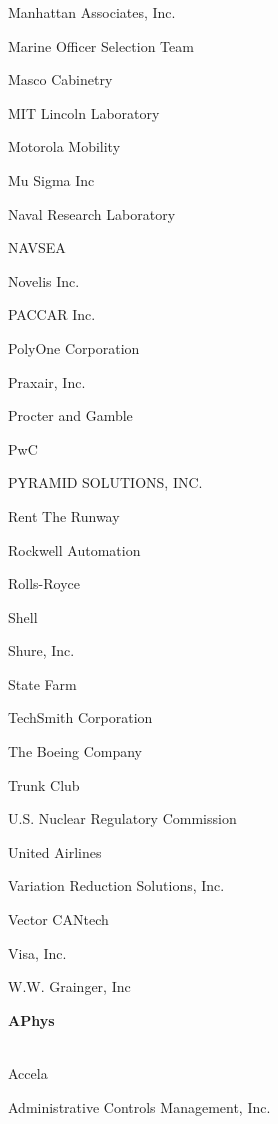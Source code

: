 \documentclass[twoside]{article}
\begin{document}
\begin{center}
\begin{multicols}{5}
\begin{FlushLeft}
\begin{compactitem}
\item Manhattan Associates, Inc.
\item Marine Officer Selection Team
\item Masco Cabinetry
\item MIT Lincoln Laboratory
\item Motorola Mobility
\item Mu Sigma Inc
\item Naval Research Laboratory
\item NAVSEA
\item Novelis Inc.
\item PACCAR Inc.
\item PolyOne Corporation
\item Praxair, Inc.
\item Procter and Gamble
\item PwC
\item PYRAMID SOLUTIONS, INC.
\item Rent The Runway
\item Rockwell Automation
\item Rolls-Royce
\item Shell
\item Shure, Inc.
\item State Farm
\item TechSmith Corporation
\item The Boeing Company
\item Trunk Club
\item U.S. Nuclear Regulatory Commission
\item United Airlines
\item Variation Reduction Solutions, Inc.
\item Vector CANtech
\item Visa, Inc.
\item W.W. Grainger, Inc
\end{compactitem}
        \end{FlushLeft}
        \vspace{1em}
        {\fontsize{14}{16}\selectfont \bf APhys}\\
        \vspace{-1em}
        ~\hrulefill~
        \vspace{-.9em}
        \begin{FlushLeft}
        \begin{compactitem}
        \item Accela
\item Administrative Controls Management, Inc.

\end{compactitem}
\end{FlushLeft}
\end{multicols}
\end{center}
\end{document}
